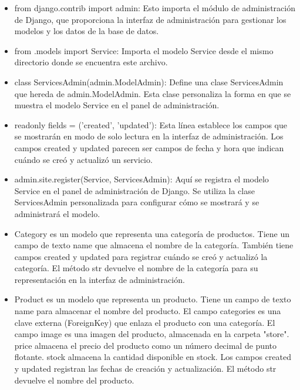 
\begin{itemize}
        \item from django.contrib import admin: Esto importa el módulo de administración de Django, que proporciona la interfaz de administración para gestionar los modelos y los datos de la base de datos.
        \item from .models import Service: Importa el modelo Service desde el mismo directorio donde se encuentra este archivo.
        \item class ServicesAdmin(admin.ModelAdmin): Define una clase ServicesAdmin que hereda de admin.ModelAdmin. Esta clase personaliza la forma en que se muestra el modelo Service en el panel de administración.
        \item readonly fields = ('created', 'updated'): Esta línea establece los campos que se mostrarán en modo de solo lectura en la interfaz de administración. Los campos created y updated parecen ser campos de fecha y hora que indican cuándo se creó y actualizó un servicio.
        \item admin.site.register(Service, ServicesAdmin): Aquí se registra el modelo Service en el panel de administración de Django. Se utiliza la clase ServicesAdmin personalizada para configurar cómo se mostrará y se administrará el modelo.
\end{itemize}

\begin{itemize}
        \item Category es un modelo que representa una categoría de productos. Tiene un campo de texto name que almacena el nombre de la categoría. También tiene campos created y updated para registrar cuándo se creó y actualizó la categoría. El método str devuelve el nombre de la categoría para su representación en la interfaz de administración.
        \item Product es un modelo que representa un producto. Tiene un campo de texto name para almacenar el nombre del producto. El campo categories es una clave externa (ForeignKey) que enlaza el producto con una categoría. El campo image es una imagen del producto, almacenada en la carpeta "store". price almacena el precio del producto como un número decimal de punto flotante. stock almacena la cantidad disponible en stock. Los campos created y updated registran las fechas de creación y actualización. El método str devuelve el nombre del producto.
\end{itemize}
